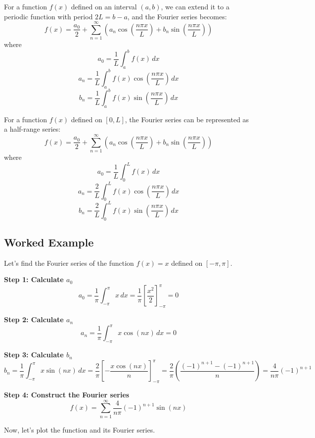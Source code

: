 \documentclass[a4paper,12pt]{article}
\begin{document}
For a function \( f(x) \) defined on an interval \( (a, b) \), we can extend it to a periodic function with period \( 2L = b - a \), and the Fourier series becomes:
\[
f(x) = \frac{a_0}{2} + \sum_{n=1}^{\infty} \left( a_n \cos\left(\frac{n\pi x}{L}\right) + b_n \sin\left(\frac{n\pi x}{L}\right) \right)
\]
where
\[
a_0 = \frac{1}{L} \int_{a}^{b} f(x) \, dx
\]
\[
a_n = \frac{1}{L} \int_{a}^{b} f(x) \cos\left(\frac{n\pi x}{L}\right) \, dx
\]
\[
b_n = \frac{1}{L} \int_{a}^{b} f(x) \sin\left(\frac{n\pi x}{L}\right) \, dx
\]

For a function \( f(x) \) defined on \( [0, L] \), the Fourier series can be represented as a half-range series:
\[
f(x) = \frac{a_0}{2} + \sum_{n=1}^{\infty} \left( a_n \cos\left(\frac{n\pi x}{L}\right) + b_n \sin\left(\frac{n\pi x}{L}\right) \right)
\]
where
\[
a_0 = \frac{1}{L} \int_{0}^{L} f(x) \, dx
\]
\[
a_n = \frac{2}{L} \int_{0}^{L} f(x) \cos\left(\frac{n\pi x}{L}\right) \, dx
\]
\[
b_n = \frac{2}{L} \int_{0}^{L} f(x) \sin\left(\frac{n\pi x}{L}\right) \, dx
\]

\subsection*{Worked Example}

Let's find the Fourier series of the function \( f(x) = x \) defined on \( [-\pi, \pi] \).

\textbf{Step 1: Calculate \( a_0 \)}
\[
a_0 = \frac{1}{\pi} \int_{-\pi}^{\pi} x \, dx = \frac{1}{\pi} \left[ \frac{x^2}{2} \right]_{-\pi}^{\pi} = 0
\]

\textbf{Step 2: Calculate \( a_n \)}
\[
a_n = \frac{1}{\pi} \int_{-\pi}^{\pi} x \cos(nx) \, dx = 0
\]

\textbf{Step 3: Calculate \( b_n \)}
\[
b_n = \frac{1}{\pi} \int_{-\pi}^{\pi} x \sin(nx) \, dx = \frac{2}{\pi} \left[ -\frac{x \cos(nx)}{n} \right]_{-\pi}^{\pi} = \frac{2}{\pi} \left( \frac{(-1)^{n+1} - (-1)^{n+1}}{n} \right) = \frac{4}{n\pi} (-1)^{n+1}
\]

\textbf{Step 4: Construct the Fourier series}
\[
f(x) = \sum_{n=1}^{\infty} \frac{4}{n\pi} (-1)^{n+1} \sin(nx)
\]

Now, let's plot the function and its Fourier series.

\begin{center}
\end{center}
\end{document}
